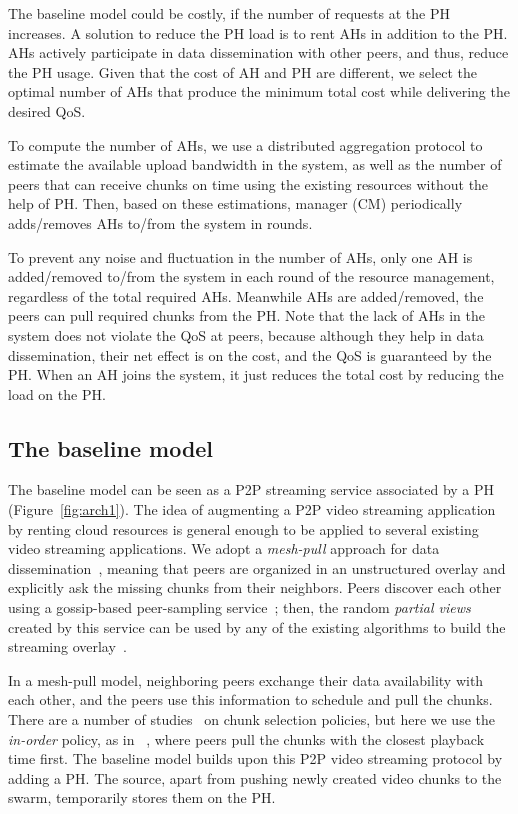 The baseline model could be costly, if the number of requests at the PH increases. A solution to reduce the PH load is to rent AHs in addition to the PH. AHs actively participate in data dissemination with other peers, and thus, reduce the PH usage. Given that the cost of AH and PH are different, we select the optimal number of AHs that produce the minimum total cost while delivering the desired QoS. 

To compute the number of AHs, we use a distributed aggregation protocol to estimate the available upload bandwidth in the system, as well as the number of peers that can receive chunks on time using the existing resources without the help of PH. Then, based on these estimations, \clive manager (CM) periodically adds/removes AHs to/from the system in rounds.

To prevent any noise and fluctuation in the number of AHs, only one AH is added/removed to/from the system in each round of the resource management, regardless of the total required AHs. Meanwhile AHs are added/removed, the peers can pull required chunks from the PH. Note that the lack of AHs in the system does not violate the QoS at peers, because although they help in data dissemination, their net effect is on the cost, and the QoS is guaranteed by the PH. When an AH joins the system, it just reduces the total cost by reducing the load on the PH.

\subsection{The baseline model}
The baseline model can be seen as a P2P streaming service associated by a
PH (Figure~\ref{fig:arch1}). The idea of augmenting a P2P video streaming application by renting
cloud resources is general enough to be applied to several existing video
streaming applications. We adopt a {\em mesh-pull} approach for data
dissemination~\cite{challenge}, meaning that peers are organized in an
unstructured overlay and explicitly ask the missing chunks from their
neighbors. Peers discover each other using a gossip-based peer-sampling
service~\cite{croupier,gozar,cyclon}; then, the random \emph{partial
views} created by this service can be used by any of the existing algorithms
to build the streaming overlay~\cite{qoe,glive,newcoolstreaming,chainsaw}.

In a mesh-pull model, neighboring peers exchange their data availability
with each other, and the peers use this information to schedule and pull the
chunks. There are a number of studies~\cite{carlsson,chunkselection}
on chunk selection policies, but here we use the {\em in-order} policy, as in
\cool~\cite{coolstreaming}, where peers pull the chunks with the
closest playback time first. The baseline model builds upon this P2P video streaming protocol by adding a
PH. The source, apart from pushing newly created
video chunks to the swarm, temporarily stores them on the PH. 

